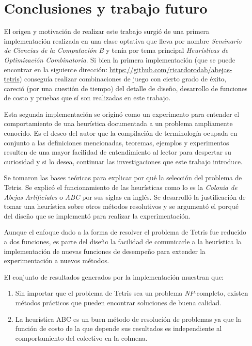 \chapter{Conclusiones y trabajo futuro}

El origen y motivación de realizar este trabajo surgió de una primera 
implementación realizada en una clase optativa que lleva por nombre 
\textit{Seminario de Ciencias de la Computación B} y tenía por tema principal 
\textit{Heurísticas de Optimización Combinatoria}. 
Si bien la primera implementación (que se puede encontrar 
en la siguiente dirección: \url{https://github.com/ricardorodab/abejas-tetris}) 
conseguía realizar combinaciones de juego con cierto grado de éxito, 
careció (por una cuestión de tiempo) del detalle de diseño, desarrollo de funciones 
de costo y pruebas que sí son realizadas en este trabajo.

Esta segunda implementación se originó como un experimento para entender el comportamiento 
de una heurística documentada a un problema ampliamente conocido. 
Es el deseo del autor que la compilación de terminología ocupada en conjunto a 
las definiciones mencionadas, teoremas, ejemplos y experimentos resulten 
de una mayor facilidad de entendimiento al lector para despertar su curiosidad 
y si lo desea, continuar las investigaciones que este trabajo introduce.

Se tomaron las bases teóricas para explicar por qué la selección del problema 
de Tetris. Se explicó el funcionamiento de las heurísticas como 
lo es la \textit{Colonia de Abejas Artificiales} o 
\textit{ABC} por sus siglas en inglés. Se desarrolló 
la justificación de tomar una heurística sobre otros métodos resolutivos y se argumentó  
el porqué del diseño que se implementó para realizar la experimentación.

Aunque el enfoque dado a la forma de resolver el problema de Tetris fue 
reducido a dos funciones, es parte del diseño la facilidad de comunicarle 
a la heurística la implementación de nuevas 
funciones de desempeño para extender la experimentación a nuevos métodos. 

El conjunto de resultados generados por la implementación muestran que: 

\begin{enumerate}

\item Sin importar que el problema de Tetris sea un problema \textsl{NP}-completo, 
existen métodos prácticos que pueden encontrar soluciones de buena calidad.

\item La heurística ABC es un buen método de resolución de problemas ya  
que la función de costo de la que depende sus resultados es independiente al 
comportamiento del colectivo en la colmena.

\end{enumerate}

